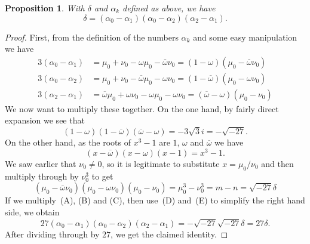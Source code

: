 \documentclass{amsart}
\newcommand{\al}        {\alpha}
\newcommand{\dl}        {\delta}
\newcommand{\om}        {\omega}
\newcommand{\omb}	{\overline{\omega}}
\renewcommand{\:}{\colon}
\newtheorem{proposition}[theorem]{Proposition}
\theoremstyle{definition}
\begin{document}
\begin{proposition}\label{prop-vandermonde}
 With $\dl$ and $\al_k$ defined as above, we have 
 \[ \dl = (\al_0-\al_1)(\al_0-\al_2)(\al_2-\al_1). \]
\end{proposition}
\begin{proof}
 First, from the definition of the numbers $\al_k$ and some easy
 manipulation we have 
 \begin{align*}
  3(\al_0-\al_1) &= \mu_0+\nu_0-\om\mu_0-\omb\nu_0 
                  = (1-\om)(\mu_0-\omb\nu_0) \tag{A} \\
  3(\al_0-\al_2) &= \mu_0+\nu_0-\omb\mu_0-\om\nu_0 
                  = (1-\omb)(\mu_0-\om\nu_0) \tag{B} \\
  3(\al_2-\al_1) &= \omb\mu_0+\om\nu_0-\om\mu_0-\om\nu_0 
                  = (\omb-\om)(\mu_0-\nu_0) \tag{D}
 \end{align*}
 We now want to multiply these together.  On the one hand, by fairly
 direct expansion we see that
 \[ (1-\om)(1-\omb)(\omb-\om) = -3\sqrt{3}i = -\sqrt{-27}. \tag{E} \]
 On the other hand, as the roots of $x^3-1$ are $1$, $\om$ and $\omb$
 we have 
 \[ (x-\omb)(x-\om)(x-1) = x^3-1. \]
 We saw earlier that $\nu_0\neq 0$, so it is legitimate to substitute
 $x=\mu_0/\nu_0$ and then multiply through by $\nu_0^3$ to get
 \[ (\mu_0-\omb\nu_0)(\mu_0-\om\nu_0)(\mu_0-\nu_0) = 
      \mu_0^3-\nu_0^3 = m-n = \sqrt{-27}\dl \tag{F}
 \]
 If we multiply~(A), (B) and (C), then use~(D) and~(E) to simplify the
 right hand side, we obtain 
 \[ 27 (\al_0-\al_1)(\al_0-\al_2)(\al_2-\al_1) = 
      -\sqrt{-27}\sqrt{-27}\dl = 27\dl.
 \]
 After dividing through by $27$, we get the claimed identity.
\end{proof}
   

\begin{bibdiv}
\begin{biblist}
\end{biblist}
\end{bibdiv}
\end{document}
